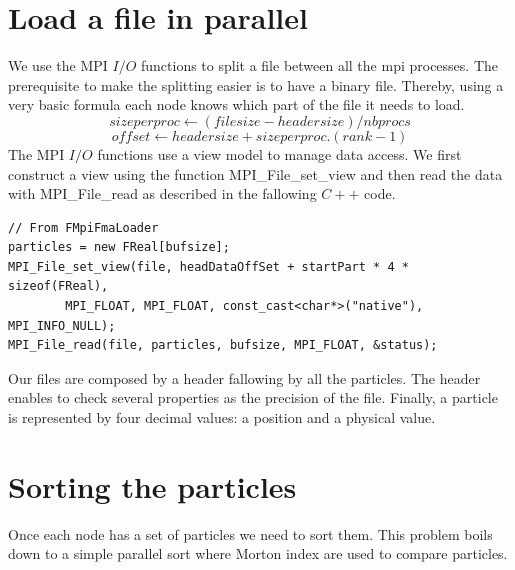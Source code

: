 \documentclass[12pt,letterpaper,titlepage]{report}
\begin{document}
\section{Load a file in parallel}
We use the MPI $I/O$ functions to split a file between all the mpi processes.
The prerequisite to make the splitting easier is to have a binary file.
Thereby, using a very basic formula each node knows which part of the file it needs to load.
\begin{equation}
size per proc \leftarrow \left (file size - header size \right ) / nbprocs
\end{equation}
\begin{equation}
offset \leftarrow header size + size per proc .\left ( rank - 1 \right )
\end{equation}
\newline
The MPI $I/O$ functions use a view model to manage data access.
We first construct a view using the function MPI\_File\_set\_view and then read the data with MPI\_File\_read as described in the fallowing $C++$ code.
\begin{lstlisting}
// From FMpiFmaLoader
particles = new FReal[bufsize];
MPI_File_set_view(file, headDataOffSet + startPart * 4 * sizeof(FReal),
        MPI_FLOAT, MPI_FLOAT, const_cast<char*>("native"), MPI_INFO_NULL);
MPI_File_read(file, particles, bufsize, MPI_FLOAT, &status);
\end{lstlisting}
Our files are composed by a header fallowing by all the particles.
The header enables to check several properties as the precision of the file.
Finally, a particle is represented by four decimal values: a position and a physical value.
\section{Sorting the particles}
Once each node has a set of particles we need to sort them.
This problem boils down to a simple parallel sort where Morton index are used to compare particles.
\end{document}
